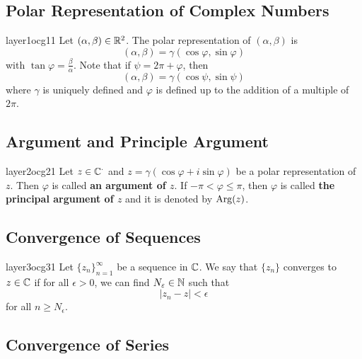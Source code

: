 \documentclass[a4paper]{article}
\begin{document}
   
\subsection*{Polar Representation of Complex Numbers}
\begin{ocg}{layer1}{ocg1}{1}
   Let \( (\alpha , \beta) \in \mathbb{R}^{2}  \). The polar representation of \( (\alpha, \beta) \) is 
   \[  (\alpha, \beta) = \gamma (\cos \varphi, \sin \varphi) \]
   with \( \tan \varphi = \frac{ \beta }{ \alpha }  \). Note that if \( \psi = 2 \pi + \varphi \), then
   \[  (\alpha, \beta) = \gamma (\cos \psi, \sin \psi) \]
   where \( \gamma  \) is uniquely defined and \( \varphi  \) is defined up to the addition of a multiple of \( 2 \pi \).
\end{ocg}


\subsection*{Argument and Principle Argument}

\begin{ocg}{layer2}{ocg2}{1}
    Let \( z \in \mathbb{C}^{\cdot} \) and \( z = \gamma (\cos \varphi + i \sin \varphi) \) be a polar representation of \( z  \). Then \( \varphi  \) is called \textbf{an argument of \( z  \)}. If \( - \pi < \varphi \leq \pi \), then \( \varphi  \) is called \textbf{the principal argument of \( z \)} and it is denoted by \( \operatorname{Arg}(z) \). 
\end{ocg}

\subsection*{Convergence of Sequences}

\begin{ocg}{layer3}{ocg3}{1}
    Let \( {\{ {z}_{n} \} }_{n=1}^{\infty }     \) be a sequence in \( \mathbb{C}  \). We say that \( \{ {z}_{n} \}   \) converges to \( z \in \mathbb{C}  \) if for all \(  \epsilon > 0  \), we can find \( {N}_{\varepsilon} \in \mathbb{N}  \) such that  
    \[  | {z}_{n} - z  |  < \epsilon \]
    for all \( n \geq {N}_{\epsilon} \).
\end{ocg}
\newline
{}

\subsection*{Convergence of Series}
\end{document}
